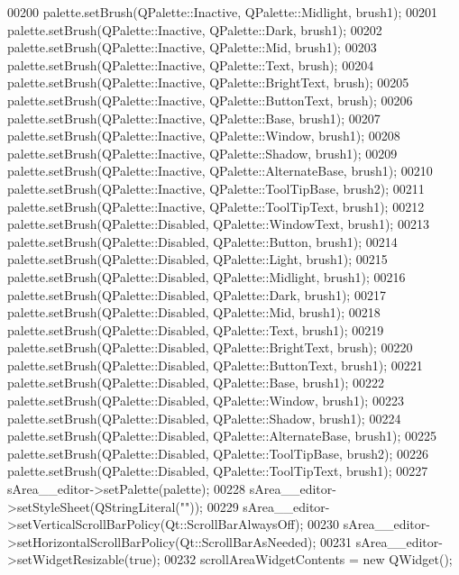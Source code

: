 \begin{DoxyCode}
00200         palette.setBrush(QPalette::Inactive, QPalette::Midlight, brush1);
00201         palette.setBrush(QPalette::Inactive, QPalette::Dark, brush1);
00202         palette.setBrush(QPalette::Inactive, QPalette::Mid, brush1);
00203         palette.setBrush(QPalette::Inactive, QPalette::Text, brush);
00204         palette.setBrush(QPalette::Inactive, QPalette::BrightText, brush);
00205         palette.setBrush(QPalette::Inactive, QPalette::ButtonText, brush);
00206         palette.setBrush(QPalette::Inactive, QPalette::Base, brush1);
00207         palette.setBrush(QPalette::Inactive, QPalette::Window, brush1);
00208         palette.setBrush(QPalette::Inactive, QPalette::Shadow, brush1);
00209         palette.setBrush(QPalette::Inactive, QPalette::AlternateBase, brush1);
00210         palette.setBrush(QPalette::Inactive, QPalette::ToolTipBase, brush2);
00211         palette.setBrush(QPalette::Inactive, QPalette::ToolTipText, brush1);
00212         palette.setBrush(QPalette::Disabled, QPalette::WindowText, brush1);
00213         palette.setBrush(QPalette::Disabled, QPalette::Button, brush1);
00214         palette.setBrush(QPalette::Disabled, QPalette::Light, brush1);
00215         palette.setBrush(QPalette::Disabled, QPalette::Midlight, brush1);
00216         palette.setBrush(QPalette::Disabled, QPalette::Dark, brush1);
00217         palette.setBrush(QPalette::Disabled, QPalette::Mid, brush1);
00218         palette.setBrush(QPalette::Disabled, QPalette::Text, brush1);
00219         palette.setBrush(QPalette::Disabled, QPalette::BrightText, brush);
00220         palette.setBrush(QPalette::Disabled, QPalette::ButtonText, brush1);
00221         palette.setBrush(QPalette::Disabled, QPalette::Base, brush1);
00222         palette.setBrush(QPalette::Disabled, QPalette::Window, brush1);
00223         palette.setBrush(QPalette::Disabled, QPalette::Shadow, brush1);
00224         palette.setBrush(QPalette::Disabled, QPalette::AlternateBase, brush1);
00225         palette.setBrush(QPalette::Disabled, QPalette::ToolTipBase, brush2);
00226         palette.setBrush(QPalette::Disabled, QPalette::ToolTipText, brush1);
00227         sArea\_\_editor->setPalette(palette);
00228         sArea\_\_editor->setStyleSheet(QStringLiteral(\textcolor{stringliteral}{""}));
00229         sArea\_\_editor->setVerticalScrollBarPolicy(Qt::ScrollBarAlwaysOff);
00230         sArea\_\_editor->setHorizontalScrollBarPolicy(Qt::ScrollBarAsNeeded);
00231         sArea\_\_editor->setWidgetResizable(\textcolor{keyword}{true});
00232         scrollAreaWidgetContents = \textcolor{keyword}{new} QWidget();

\end{DoxyCode}
